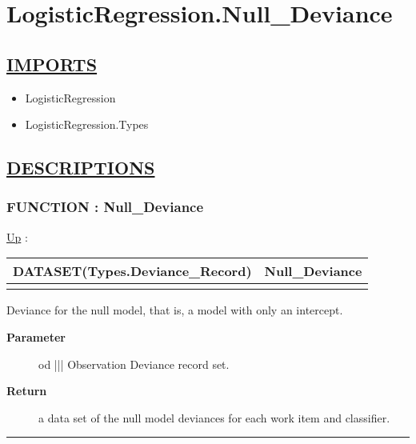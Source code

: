 \chapter*{LogisticRegression.Null\_Deviance}
\hypertarget{ecldoc:toc:LogisticRegression.Null_Deviance}{}

\section*{\underline{IMPORTS}}
\begin{itemize}
\item LogisticRegression
\item LogisticRegression.Types
\end{itemize}

\section*{\underline{DESCRIPTIONS}}
\subsection*{FUNCTION : Null\_Deviance}
\hypertarget{ecldoc:logisticregression.null_deviance}{}
\hyperlink{ecldoc:toc:LogisticRegression}{Up} :

{\renewcommand{\arraystretch}{1.5}
\begin{tabularx}{\textwidth}{|>{\raggedright\arraybackslash}l|X|}
\hline
\hspace{0pt}DATASET(Types.Deviance\_Record) & Null\_Deviance \\
\hline
\multicolumn{2}{|>{\raggedright\arraybackslash}X|}{\hspace{0pt}(DATASET(Types.Observation\_Deviance) od)} \\
\hline
\end{tabularx}
}

\par
Deviance for the null model, that is, a model with only an intercept.

\par
\begin{description}
\item [\textbf{Parameter}] od ||| Observation Deviance record set.
\item [\textbf{Return}] a data set of the null model deviances for each work item and classifier.
\end{description}

\rule{\linewidth}{0.5pt}
